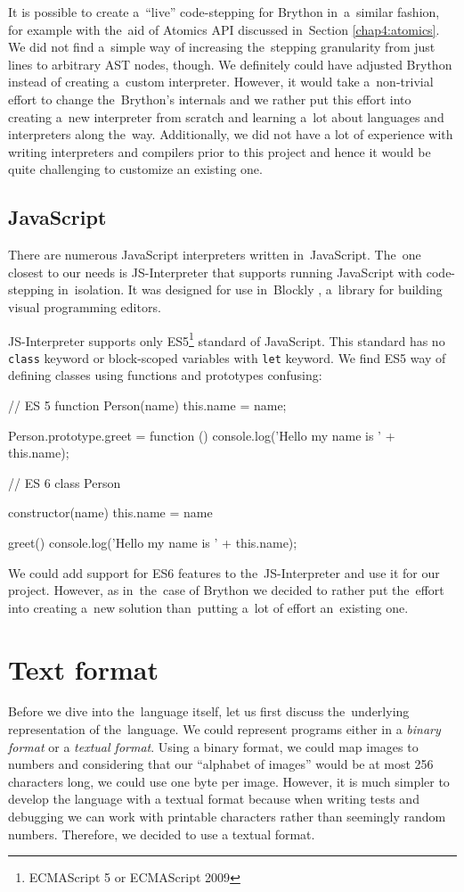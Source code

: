 It is possible to create a~``live'' code-stepping for Brython in~a~similar fashion, for example with the~aid of Atomics API discussed in~Section \ref{chap4:atomics}.
We did not find a~simple way of increasing the~stepping granularity from just lines to arbitrary AST nodes, though. We definitely could have adjusted Brython instead
of creating a~custom interpreter. However, it would take a~non-trivial effort to change the~Brython's internals and we rather put this effort into creating
a~new interpreter from scratch and learning a~lot about languages and interpreters along the~way. Additionally, we did not have a lot of experience with writing
interpreters and compilers prior to this project and hence it would be quite challenging to customize an existing one.

\subsection{JavaScript}
\label{chap3:javascript}
There are numerous JavaScript interpreters written in~JavaScript. The~one closest to our needs is JS-Interpreter \cite{JSInterpreter} that supports running JavaScript
with code-stepping in~isolation. It was designed for use in~Blockly \cite{Blockly}, a~library for building visual programming editors.

JS-Interpreter supports only ES5\footnote{ECMAScript 5 or ECMAScript 2009} standard of JavaScript. This standard has no \texttt{class} keyword or block-scoped
variables with \texttt{let} keyword. We find ES5 way of defining classes using functions and prototypes confusing:
\begin{code}
// ES 5
function Person(name) {
    this.name = name;  
}

Person.prototype.greet = function () {
    console.log('Hello my name is ' + this.name);
}

// ES 6
class Person {
    constructor(name) {
        this.name = name
    }

    greet() {
        console.log('Hello my name is ' + this.name);
    }
}
\end{code}

We could add support for ES6 features to the~JS-Interpreter and use it for our project. However, as in~the~case of Brython we decided to rather put the~effort into
creating a~new solution than~putting a~lot of effort an~existing one.

\section{Text format}
Before we dive into the~language itself, let us first discuss the~underlying representation of the~language. We could represent programs either
in a \emph{binary format} or a \emph{textual format}. Using a binary format, we could map images to numbers and considering that our ``alphabet of images''
would be at most 256 characters long, we could use one byte per image. However, it is much simpler to develop the language with a textual format because
when writing tests and debugging we can work with printable characters rather than seemingly random numbers. Therefore, we decided to use a textual format.


